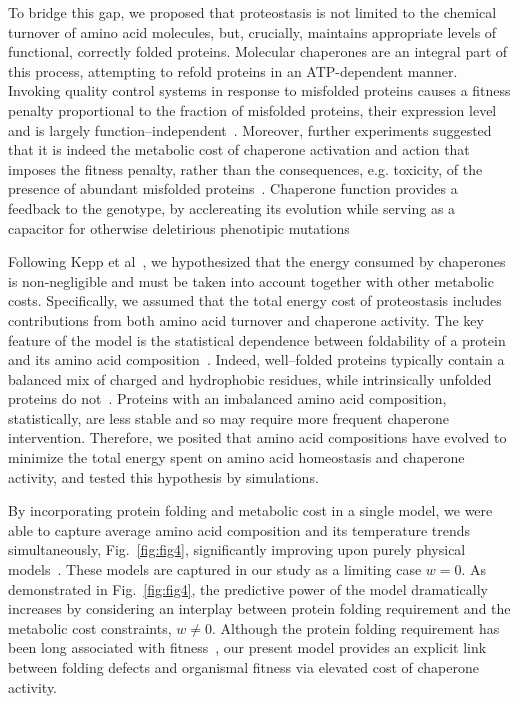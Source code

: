\documentclass[10pt,letterpaper]{article}
\begin{document}
To bridge this gap, we proposed that proteostasis is not limited to the chemical turnover of amino acid molecules, but, crucially, maintains appropriate levels of functional, correctly folded proteins. Molecular chaperones are an integral part of this process, attempting to refold proteins in an ATP-dependent manner. Invoking quality control systems in response to misfolded proteins causes a fitness penalty proportional to the fraction of misfolded proteins, their expression level and is largely function--independent~\cite{Samerotte2011Misfolded}. Moreover, further experiments suggested that it is indeed the metabolic cost of chaperone activation and action that imposes the fitness penalty, rather than the consequences, e.g. toxicity, of the presence of abundant misfolded proteins~\cite{Tomala2014Fitness}. Chaperone function provides a feedback to the genotype, by acclereating its evolution while serving as a capacitor for otherwise deletirious phenotipic mutations~\cite{Bogumil2012Cumulative,Cetinbas2013Catalysis}

Following Kepp et al~\cite{Kepp2014Model}, we hypothesized that the energy consumed by chaperones is non-negligible and must be taken into account together with other metabolic costs. Specifically, we assumed that the total energy cost of proteostasis includes contributions from both amino acid turnover and chaperone activity. The key feature of the model is the statistical dependence between foldability of a protein and its amino acid composition~\cite{Dill1985Theory,Berezovsky2007Positive,Venev2015Massively}. Indeed, well--folded proteins typically contain a balanced mix of charged and hydrophobic residues, while intrinsically unfolded proteins do not~\cite{Uversky2000Why}. Proteins with an imbalanced amino acid composition, statistically, are less stable and so may require more frequent chaperone intervention. Therefore, we posited that amino acid compositions have evolved to minimize the total energy spent on amino acid homeostasis and chaperone activity, and tested this hypothesis by simulations.

By incorporating protein folding and metabolic cost in a single model, we were able to capture average amino acid composition and its temperature trends simultaneously, Fig.~\ref{fig:fig4}, significantly improving upon purely physical models~\cite{Berezovsky2007Positive,Venev2015Massively}. These  models are captured in our study as a limiting case $w=0$. As demonstrated in Fig.~\ref{fig:fig4}, the predictive power of the model dramatically increases by considering an interplay between protein folding requirement and the metabolic cost constraints, $w\neq 0$. Although the protein folding requirement has been long associated with fitness~\cite{Taverna2002Why,Bloom2006Protein,Zeldovich2007First,Lobkovsky2010Universal}, our present model provides an explicit link between folding defects and organismal fitness via elevated cost of chaperone activity.
\end{document}
